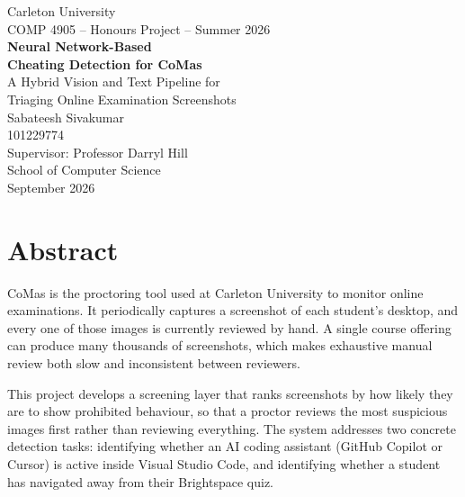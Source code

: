 \documentclass[12pt,oneside]{report}
\begin{document}
\begin{titlepage}
\centering
\vspace*{2cm}

{\large Carleton University}\\[0.3cm]
{\large COMP 4905 -- Honours Project -- Summer 2026}\\[4cm]

{\Huge\bfseries Neural Network-Based\\[0.3cm] Cheating Detection for CoMas}\\[1cm]

{\Large A Hybrid Vision and Text Pipeline for\\[0.2cm]
Triaging Online Examination Screenshots}\\[5cm]

{\large Sabateesh Sivakumar}\\[0.2cm]
{\large 101229774}\\[1.5cm]

{\large Supervisor: Professor Darryl Hill}\\[0.2cm]
{\large School of Computer Science}\\[2cm]

{\large September 2026}

\vfill
\end{titlepage}

\chapter*{Abstract}

CoMas is the proctoring tool used at Carleton University to monitor online
examinations. It periodically captures a screenshot of each student's desktop,
and every one of those images is currently reviewed by hand. A single course
offering can produce many thousands of screenshots, which makes exhaustive
manual review both slow and inconsistent between reviewers.

This project develops a screening layer that ranks screenshots by how likely
they are to show prohibited behaviour, so that a proctor reviews the most
suspicious images first rather than reviewing everything. The system addresses
two concrete detection tasks: identifying whether an AI coding assistant
(GitHub Copilot or Cursor) is active inside Visual Studio Code, and identifying
whether a student has navigated away from their Brightspace quiz.
\end{document}
